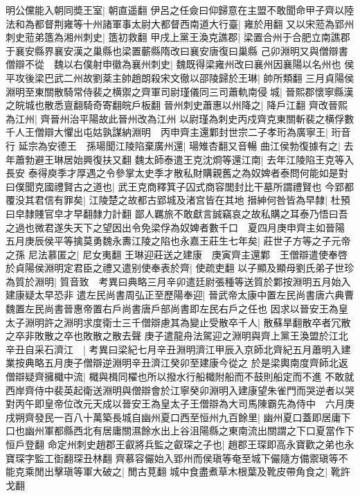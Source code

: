 明公儻能入朝同奬王室|{
	朝直遥翻}
伊呂之任僉曰仰歸意在主盟不敢聞命甲子齊以陸法和為都督荆雍等十州諸軍事太尉大都督西南道大行臺|{
	雍於用翻}
又以宋蒞為郢州刺史蒞弟簉為湘州刺史|{
	簉初救翻}
甲戌上黨王渙克譙郡|{
	梁置合州于合肥立南譙郡于襄安縣界襄安漢之巢縣也梁置蘄縣隋改曰襄安唐復曰巢縣}
己卯淵明又與僧辯書僧辯不從　魏以右僕射申徽為襄州刺史|{
	魏既得梁雍州改曰襄州因襄陽以名州也}
侯平攻後梁巴武二州故劉棻主帥趙朗殺宋文徹以邵陵歸於王琳|{
	帥所類翻}
三月貞陽侯淵明至東關散騎常侍裴之横禦之齊軍司尉瑾儀同三司蕭軌南侵城|{
	晉熙郡懷寧縣漢之皖城也散悉亶翻騎奇寄翻皖戶板翻}
晉州刺史蕭惠以州降之|{
	降戶江翻}
齊改晉熙為江州|{
	齊晉州治平陽故此晉州改為江州}
以尉瑾為刺史丙戍齊克東關斬裴之横俘數千人王僧辯大懼出屯姑孰謀納淵明　丙申齊主還鄴封世宗二子孝珩為廣寧王|{
	珩音行}
延宗為安德王　孫瑒聞江陵陷棄廣州還|{
	瑒雉杏翻又音暢}
曲江侯勃復據有之|{
	去年蕭勃避王琳居始興復扶又翻}
魏太師泰遣王克沈烱等還江南|{
	去年江陵陷王克等入長安}
泰得庾季才厚遇之令參掌太史季才散私財購親舊之為奴婢者泰問何能如是對曰僕聞克國禮賢古之道也|{
	武王克商釋箕子囚式商容閭封比干墓所謂禮賢也}
今郢都覆没其君信有罪矣|{
	江陵楚之故都古郢城及渚宫皆在其地}
搢紳何咎皆為早隸|{
	杜預曰皁隸賤官皁才早翻隸力計翻}
鄙人羈旅不敢獻言誠竊哀之故私購之耳泰乃悟曰吾之過也微君遂失天下之望因出令免梁俘為奴婢者數千口　夏四月庚申齊主如晉陽　五月庚辰侯平等擒莫勇魏永夀江陵之陷也永嘉王莊生七年矣|{
	莊世子方等之子元帝之孫}
尼法慕匿之|{
	尼女夷翻}
王琳迎莊送之建康　庚寅齊主還鄴　王僧辯遣使奉啓於貞陽侯淵明定君臣之禮又遣别使奉表於齊|{
	使疏吏翻}
以子顯及顯母劉氏弟子世珍為質於淵明|{
	質音致　考異曰典略三月辛卯遣廷尉張種等送質於鄴按淵明五月始入建康疑太早恐非}
遣左民尚書周弘正至歷陽奉迎|{
	晉武帝太康中置左民尚書唐六典曹魏置左民尚書晉惠帝置右戶尚書唐戶部尚書即左民右戶之任也}
因求以晉安王為皇太子淵明許之淵明求度衛士三千僧辯慮其為變止受散卒千人|{
	散蘇旱翻散卒者冗散之卒非敗散之卒也敗散之散去聲}
庚子遣龍舟法駕迎之淵明與齊上黨王渙盟於江北辛丑自采石濟江　|{
	考異曰梁紀七月辛丑淵明濟江甲辰入京師北齊紀五月蕭明入建業按典略五月庚子僧辯逆淵明辛丑濟江癸卯至建康今從之}
於是梁輿南度齊師北返僧辯疑齊擁檝中流|{
	檝與楫同櫂也所以撥水行船檝附船而不鼓則船定而不進}
不敢就西岸齊侍中裴英起衛送淵明與僧辯會於江寧癸卯淵明入建康望朱雀門而哭逆者以哭對丙午即皇帝位改元天成以晉安王為皇太子王僧辯為大司馬陳霸先為侍中　六月庚戌朔齊發民一百八十萬築長城自幽州夏口西至恒州九百餘里|{
	幽州夏口蓋即居庸下口也幽州軍都縣西北有居庸關濕餘水出上谷沮陽縣之東南流出關謂之下口夏當作下恒戶登翻}
命定州刺史趙郡王叡將兵監之叡琛之子也|{
	趙郡王琛即高永寶歡之弟也永寶琛字監工衘翻琛丑林翻}
齊慕容儼始入郢州而侯瑱等奄至城下儼隨方備禦瑱等不能克乘閒出擊瑱等軍大破之|{
	閒古莧翻}
城中食盡煮草木根葉及靴皮帶角食之|{
	靴許戈翻}

